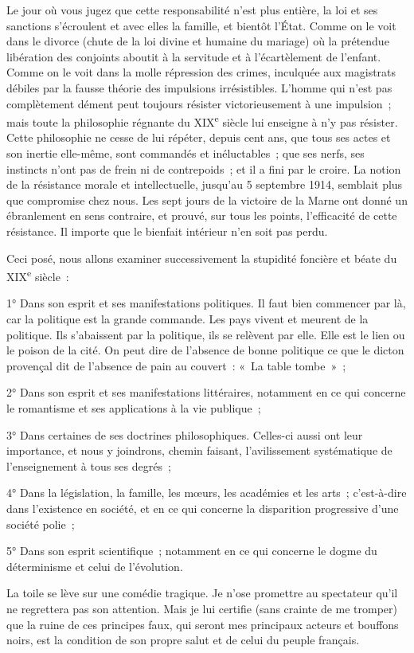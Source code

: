 \documentclass[french,twoside]{book} %
\newcommand\chapterclose{} %
\begin{document}
Le jour où vous jugez que cette responsabilité n’est plus entière, la loi et ses sanctions s’écroulent et avec elles la famille, et bientôt l’État. Comme on le voit dans le divorce (chute de la loi divine et humaine du mariage) où la prétendue libération des conjoints aboutit à la servitude et à l’écartèlement de l’enfant. Comme on le voit dans la molle répression des crimes, inculquée aux magistrats débiles par la fausse théorie des impulsions irrésistibles. L’homme qui n’est pas complètement dément peut toujours résister victorieusement à une impulsion ; mais toute la philosophie régnante du XIX\textsuperscript{e} siècle lui enseigne à n’y pas résister. Cette philosophie ne cesse de lui répéter, depuis cent ans, que tous ses actes et son inertie elle-même, sont commandés et inéluctables ; que ses nerfs, ses instincts n’ont pas de frein ni de contrepoids ; et il a fini par le croire. La notion de la résistance morale et intellectuelle, jusqu’au 5 septembre 1914, semblait plus que compromise chez nous. Les sept jours de la victoire de la Marne ont donné un ébranlement en sens contraire, et prouvé, sur tous les points, l’efficacité de cette résistance. Il importe que le bienfait intérieur n’en soit pas perdu.\par
Ceci posé, nous allons examiner successivement la stupidité foncière et béate du XIX\textsuperscript{e} siècle :\par
1° Dans son esprit et ses manifestations politiques. Il faut bien commencer par là, car la politique est la grande commande. Les pays vivent et meurent de la politique. Ils s’abaissent par la politique, ils se relèvent par elle. Elle est le lien ou le poison de la cité. On peut dire de l’absence de bonne politique ce que le dicton provençal dit de l’absence de pain au couvert : « La table tombe » ;\par
2° Dans son esprit et ses manifestations littéraires, notamment en ce qui concerne le romantisme et ses applications à la vie publique ;\par
3° Dans certaines de ses doctrines philosophiques. Celles-ci aussi ont leur importance, et nous y joindrons, chemin faisant, l’avilissement systématique de l’enseignement à tous ses degrés ;\par
4° Dans la législation, la famille, les mœurs, les académies et les arts ; c’est-à-dire dans l’existence en société, et en ce qui concerne la disparition progressive d’une société polie ;\par
5° Dans son esprit scientifique ; notamment en ce qui concerne le dogme du déterminisme et celui de l’évolution.\par
La toile se lève sur une comédie tragique. Je n’ose promettre au spectateur qu’il ne regrettera pas son attention. Mais je lui certifie (sans crainte de me tromper) que la ruine de ces principes faux, qui seront mes principaux acteurs et bouffons noirs, est la condition de son propre salut et de celui du peuple français.
\chapterclose
\end{document}
